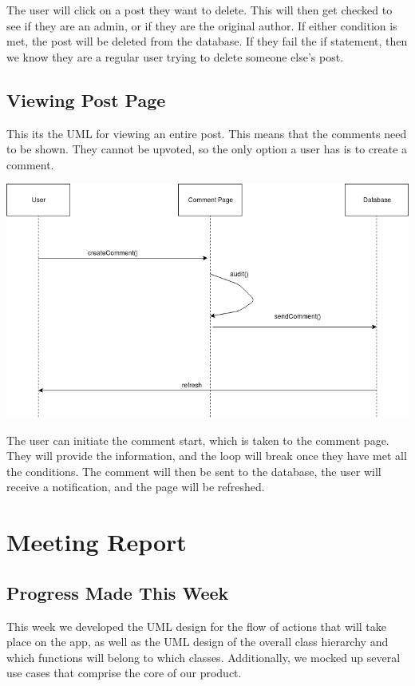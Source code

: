 \documentclass[12pt]{article}
\begin{document}
The user will click on a post they want to delete. This will then get checked to see if they are an admin, or if they are the original author. If either condition is met, the post will be deleted from the database. If they fail the if statement, then we know they are a regular user trying to delete someone else’s post.
\subsection{Viewing Post Page}
This its the UML for viewing an entire post. This means that the comments need to be shown. They cannot be upvoted, so the only option a user has is to create a comment.

\includegraphics[scale=0.50]{img/uml/createComment}

The user can initiate the comment start, which is taken to the comment page. They will provide the information, and the loop will break once they have met all the conditions. The comment will then be sent to the database, the user will receive a notification, and the page will be refreshed.

\section{Meeting Report}

\subsection{Progress Made This Week}
This week we developed the UML design for the flow of actions that will take place on the app, as well as the UML design of the overall class hierarchy and which functions will belong to which classes. Additionally, we mocked up several use cases that comprise the core of our product.
\end{document}
